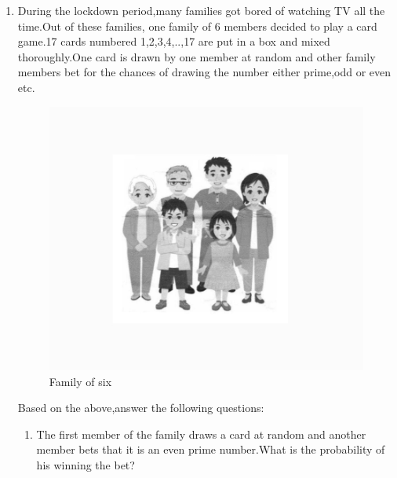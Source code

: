 
\begin{enumerate}[label=\thesection.\arabic*.,ref=\thesection.\theenumi]
\item During the lockdown period,many families got bored of watching TV all the time.Out of these families, one family of 6 members decided to play a card game.17 cards numbered 1,2,3,4,..,17 are put in a box and mixed thoroughly.One card is drawn by one member at random and other family members bet for the chances of drawing the number either prime,odd or even etc.
\begin{figure}[H]
\centering
	\includegraphics[width=\columnwidth]{figs/satish.jpg}                                                                                              
\caption{Family of six}
\label{fig:satish.jpg}                                                                                                                      \end{figure}
Based on the above,answer the following questions:
\begin{enumerate}[label=(\roman*)]                                                                                                                                         \item The first member of the family draws a card at random and another member bets that it is an even prime number.What is the probability of his winning the bet?                                                                                                                           \begin{enumerate}[label=(\Alph*)]

\end{enumerate}
\end{enumerate}
\end{enumerate}

